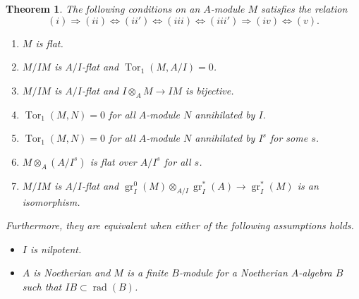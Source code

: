 \documentclass[leqno]{amsart}
\makeatletter
\newcommand\myprimeitem{%
 \item[(\roman{enumi}\textquotesingle)]\def\@currentlabel{(\roman{enumi}\textquotesingle)}}
\DeclareMathOperator{\gr}{gr}
\DeclareMathOperator{\rad}{rad}
\newcommand{\1}{\mathbf{1}}
\DeclareMathOperator{\Tor}{Tor}
\newtheorem{thm}{Theorem}[section]
\theoremstyle{definition}
\theoremstyle{remark}
\makeatother
\begin{document}
\begin{thm}\label{thm:criterion}
	The following conditions on an $A$-module $M$
	satisfies the relation
	\[
		(i)\Longrightarrow 
		(ii) \Longleftrightarrow (ii')\Longleftrightarrow 
		(iii) \Longleftrightarrow (iii') \Longrightarrow
		(iv) \Longleftrightarrow (v).
	\]
	\begin{enumerate}[label=(\roman*)]
		\item $M$ is flat.
		\item  $M/IM$ is $A/I$-flat and $\Tor_1(M,A/I)=0$.
		\myprimeitem  $M/IM$ is $A/I$-flat 
		and $I\otimes_AM\to IM$ is bijective.
		\item $\Tor_1(M,N)=0$ for all $A$-module $N$ annihilated by $I$.
		\myprimeitem $\Tor_1(M,N)=0$ 
		for all $A$-module $N$ annihilated by $I^s$ for some $s$.
		\item $M\otimes_A(A/I^s)$ is flat over $A/I^s$ for all $s$.
		\item  $M/IM$ is $A/I$-flat and 
			$\gr_I^0(M)\otimes_{A/I}\gr_I^*(A)\to \gr_I^*(M)$
			is an isomorphism.
	\end{enumerate}
	Furthermore, they are equivalent
	when either of the following assumptions holds.
	\begin{itemize}
		\item $I$ is nilpotent.
		\item $A$ is Noetherian and $M$ is a finite  $B$-module
		for a Noetherian $A$-algebra $B$ such that $IB\subset\rad(B)$.
	\end{itemize}
\end{thm}
\end{document}
